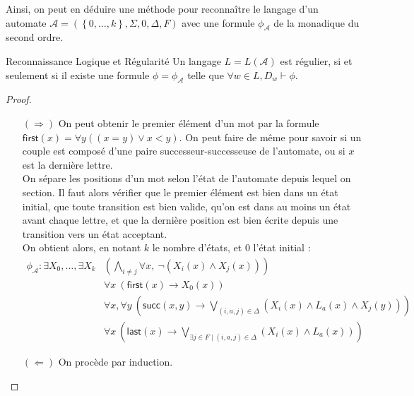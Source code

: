 \documentclass{cours}
\begin{document}
Ainsi, on peut en déduire une méthode pour reconnaître le langage d'un automate $\mathcal{A} = \left(\left\{0, \ldots, k\right\}, \Sigma, 0, \Delta, F\right)$ avec une formule $\phi_{\mathcal{A}}$ de la monadique du second ordre.

\begin{théorème}{Reconnaissance Logique et Régularité}
    Un langage $L = L(\mathcal{A})$ est régulier, si et seulement si il existe une formule $\phi = \phi_{\mathcal{A}}$ telle que $\forall w \in L, D_{w} \vdash \phi$.
\end{théorème}

\begin{proof}
    \begin{itemize}
        \item[$(\Rightarrow)$] On peut obtenir le premier élément d'un mot par la formule $\textsf{first}(x) = \forall y ((x = y)\lor x < y)$. On peut faire de même pour savoir si un couple est composé d'une paire successeur-successeuse de l'automate, ou si $x$ est la dernière lettre.\\
        On sépare les positions d'un mot selon l'état de l'automate depuis lequel on section. Il faut alors vérifier que le premier élément est bien dans un état initial, que toute transition est bien valide, qu'on est dans au moins un état avant chaque lettre, et que la dernière position est bien écrite depuis une transition vers un état acceptant. \\
        On obtient alors, en notant $k$ le nombre d'états, et $0$ l'état initial : 
        \begin{equation}
            \begin{split}
                \phi_{\mathcal{A}} : \exists X_{0}, \ldots, \exists X_{k} & \left(\bigwedge_{i \neq j} \forall x, \ \lnot \left(X_{i}(x) \land X_{j}(x)\right)\right)\\
                & \forall x \ \left(\textsf{first}(x) \rightarrow X_{0}(x)\right)\\
                & \forall x, \forall y \ \left(\textsf{succ}(x, y) \rightarrow \bigvee_{(i, a, j) \in \Delta}\left(X_{i}(x) \land L_{a}(x) \land X_{j}(y)\right)\right)\\
                & \forall x \ \left(\textsf{last}(x) \rightarrow \bigvee_{\exists j \in F \mid (i, a, j) \in \Delta} \left(X_{i}(x) \land L_{a}(x)\right)\right)
            \end{split}
        \end{equation}
        \item[$(\Leftarrow)$] On procède par induction. 

\end{itemize}
\end{proof}
\end{document}
